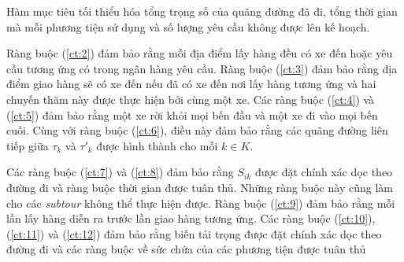 Hàm mục tiêu tối thiểu hóa tổng trọng số của quãng đường đã đi, tổng thời gian mà mỗi phương tiện sử dụng và số lượng yêu cầu không được lên kế hoạch.

Ràng buộc (\ref{ct:2}) đảm bảo rằng mỗi địa điểm lấy hàng đều có xe đến hoặc yêu cầu tương ứng có trong ngân hàng yêu cầu. Ràng buộc (\ref{ct:3}) đảm bảo rằng địa điểm giao hàng sẽ có xe đến nếu đã có xe đến nơi lấy hàng tương ứng và hai chuyến thăm này được thực hiện bởi cùng một xe. Các ràng buộc (\ref{ct:4}) và (\ref{ct:5}) đảm bảo rằng một xe rời khỏi mọi bến đầu và một xe đi vào mọi bến cuối. Cùng với ràng buộc (\ref{ct:6}), điều này đảm bảo rằng các quãng đường liên tiếp giữa $\tau_k$ và $\tau'_k$ được hình thành cho mỗi $k \in K$.

Các ràng buộc (\ref{ct:7}) và (\ref{ct:8}) đảm bảo rằng $S_{ik}$ được đặt chính xác dọc theo đường đi và ràng buộc thời gian được tuân thủ. Những ràng buộc này cũng làm cho các \textit{subtour} không thể thực hiện được.
Ràng buộc (\ref{ct:9}) đảm bảo rằng mỗi lần lấy hàng diễn ra trước lần giao hàng tương ứng. Các ràng buộc (\ref{ct:10}), (\ref{ct:11}) và (\ref{ct:12}) đảm bảo rằng biến tải trọng được đặt chính xác dọc theo đường đi và các ràng buộc về sức chứa của các phương tiện được tuân thủ
